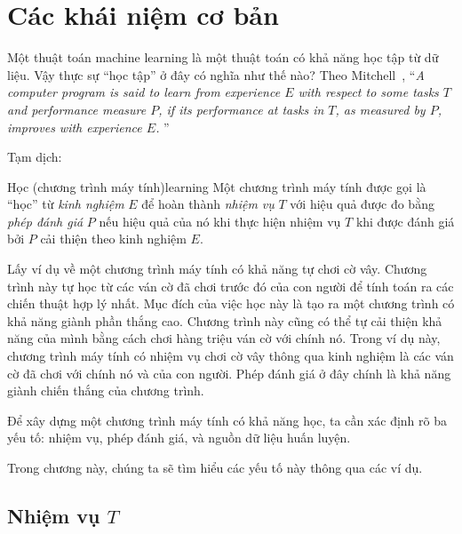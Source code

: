 
\chapter{Các khái niệm cơ bản}



Một thuật toán machine learning là một thuật toán có khả năng {học tập} từ dữ
liệu. Vậy thực sự ``học tập'' ở đây có nghĩa như thế nào? Theo
Mitchell~\cite{mitchell1997machine}, ``\textit{A computer program is said to learn from
\textit{experience} $E$ with respect to some \textit{tasks} $T$ and
\textit{performance measure} $P$, if its performance at tasks in $T$, as
measured by $P$, improves with experience $E$.}
''

Tạm dịch: 

\begin{mydef}{Học (chương trình máy tính)}{learning}
Một chương trình máy tính được gọi là ``học'' từ \textit{kinh nghiệm} $E$
để hoàn thành \textit{nhiệm vụ} $T$ với hiệu quả được đo bằng \textit{phép đánh
giá} $P$ nếu hiệu quả của nó khi thực hiện nhiệm vụ $T$ khi được đánh giá bởi
$P$ cải thiện theo kinh nghiệm $E$.
\end{mydef}

Lấy ví dụ về một chương trình máy tính có khả năng tự chơi cờ vây. Chương trình này tự học từ các ván cờ đã chơi trước đó của con người để tính toán ra các chiến thuật hợp lý nhất. Mục đích của việc học này là tạo ra một chương trình có khả năng giành phần thắng cao. Chương trình này cũng có thể tự cải thiện khả năng của mình bằng cách chơi hàng triệu ván cờ với chính nó. Trong ví dụ này, chương trình máy tính có nhiệm vụ chơi cờ vây thông qua kinh nghiệm là {các ván cờ đã chơi} với chính nó và của con người. Phép đánh giá ở đây chính là khả năng giành chiến thắng của chương trình.

Để xây dựng một chương trình máy tính có khả năng học, ta cần xác định rõ ba yếu tố: nhiệm vụ, phép đánh giá, và nguồn dữ liệu huấn luyện. 

Trong chương này, chúng ta sẽ tìm hiểu các yếu tố này thông qua các ví dụ.

\section{Nhiệm vụ $T$}


